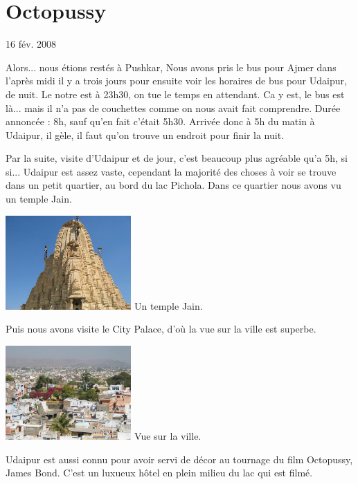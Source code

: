 \section{Octopussy}

16 fév. 2008

\begin{multicols}{2}

Alors... nous étions restés à Pushkar, Nous avons pris le bus pour Ajmer dans l'après midi il y a trois jours pour ensuite voir les horaires de bus pour Udaipur, de nuit. Le notre est à 23h30, on tue le temps en attendant. Ca y est, le bus est là... mais il n'a pas de couchettes comme on nous avait fait comprendre. Durée annoncée : 8h, sauf qu'en fait c'était 5h30. Arrivée donc à 5h du matin à Udaipur, il gèle, il faut qu'on trouve un endroit pour finir la nuit.

Par la suite, visite d'Udaipur et de jour, c'est beaucoup plus agréable qu'a 5h, si si... Udaipur est assez vaste, cependant la majorité des choses à voir se trouve dans un petit quartier, au bord du lac Pichola. Dans ce quartier nous avons vu un temple Jain.

\hspace*{-0.65cm}
\includegraphics[width=4.8cm]{articles/Octopussy/jain.jpg}
Un temple Jain.

Puis nous avons visite le City Palace, d'où la vue sur la ville est superbe.

\hspace*{-0.65cm}
\includegraphics[width=4.8cm]{articles/Octopussy/zoomville.jpg}
Vue sur la ville.

Udaipur est aussi connu pour avoir servi de décor au tournage du film Octopussy, James Bond. C'est un luxueux hôtel en plein milieu du lac qui est filmé.


\end{multicols}
